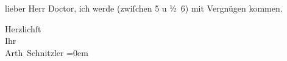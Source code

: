 \pstart{}lieber Herr Doctor,\pend\vspace{0.5em}
\pstart
           ich werde \label{K_L03773-1v}\label{K_L03773-1} (zwiſchen 5 u
                  ½ 6) mit Vergnügen kommen.\pend
           
\pstart
           Herzlichſt{\\[\baselineskip]}Ihr{\\[\baselineskip]}\spacefill\mbox{Arth Schnitzler}\pend
           \leftskip=0em{}\endnumbering{}  \newcommand{\dateiname}{L03773}\newcommand{\titel}{Arthur Schnitzler an Stefan Zweig, 15. 2. 1915}\newcommand{\editorInnen}{Selma Jahnke und Martin Anton Müller}
